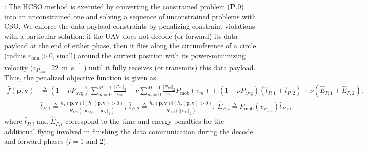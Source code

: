 \documentclass[12pt, draftcls, onecolumn]{IEEEtran}
\theoremstyle{plain}
\theoremstyle{definition}
\theoremstyle{remark}
\begin{document}
: The HCSO method is executed by converting the constrained problem ($\mathbf{P.0}$) into an unconstrained one and solving a sequence of unconstrained problems with CSO. We enforce the data payload constraints by penalizing constraint violations with a particular solution: if the UAV does not {decode} (or {forward}) its data payload at the end of either phase, then it flies along the circumference of a circle (radius $r_{\mathrm{min}}{>}0$, small) around the current position with its power-minimizing velocity ($v_{P_{\mathrm{min}}}$=\qty[mode=text]{22}{\meter\per\second} \cite{SCA}) until it fully receives (or transmits) this data payload. Thus, the penalized objective function is given as
\begin{align*}
    \hat{f}(\mathbf{p},\mathbf{v})&{\triangleq}(1{-}\nu P_{\mathrm{avg}})\sum_{m{=}0}^{M{-}1}\frac{\Vert\Psi_{m}\Vert_{2}}{v_{m}}{+}\nu \sum_{m{=}0}^{M{-}1}\frac{\Vert\Psi_{m}\Vert_{2}}{v_{m}}P_{\mathrm{mob}}(v_{m}){+}(1{-}\nu P_{\mathrm{avg}})(\hat{t}_{P,1}{+}\hat{t}_{P,2}){+}\nu(\hat{E}_{P,1}{+}\hat{E}_{P,2});\nonumber\\
    &\hat{t}_{P,1}{\triangleq}\frac{h_{1}(\mathbf{p},\mathbf{v})\mathbb{I}\left(h_{1}(\mathbf{p},\mathbf{v}){>}0\right)}{\bar{R}_{GU}\left(\Vert\mathbf{x}_{M/2}-\mathbf{x}_{G}\Vert_{2}\right)};\ 
    \hat{t}_{P,2}{\triangleq}\frac{h_{2}(\mathbf{p},\mathbf{v})\mathbb{I}(h_{2}(\mathbf{p},\mathbf{v}){>}0)}{\bar{R}_{UB}\left(\Vert\mathbf{x}_{M}\Vert_{2}\right)};\ \hat{E}_{P,i}{\triangleq}P_{\mathrm{mob}}(v_{P_{\mathrm{min}}})\hat{t}_{P,i},
\end{align*}
where $\hat{t}_{P,i}$ and $\hat{E}_{P,i}$ correspond to the time and energy penalties for the additional flying involved in finishing the data communication during the decode and forward phases ($i{=}1\text{ and }2)$. 
\end{document}
